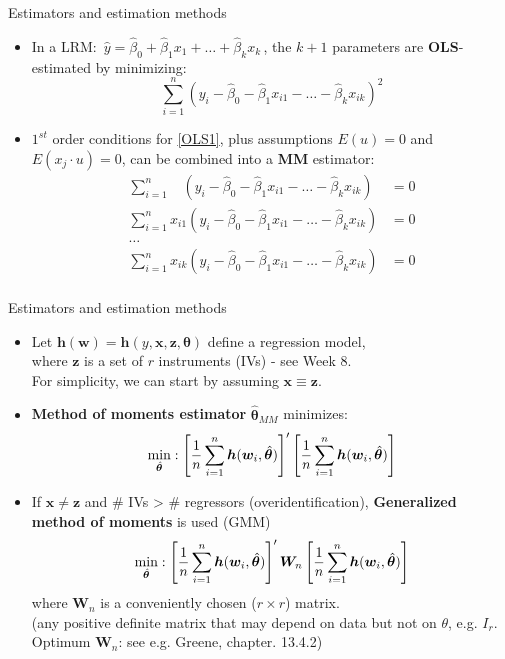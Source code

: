 \documentclass{beamer}
\begin{document}
\begin{frame}{Estimators and estimation methods}
\begin{itemize}
\item In a LRM: $\, \hat{y} = \hat{\beta}_0 + \hat{\beta}_1 x_{1} + \dots + \hat{\beta}_k x_{k} \,$, the $k+1$ parameters are \textbf{OLS}-estimated by minimizing:
\begin{equation} \label{OLS1}
\sum_{i=1}^n \left( y_i - \hat{\beta}_0 - \hat{\beta}_1 x_{i1} - \dots - \hat{\beta}_k x_{ik} \right)^2
\end{equation}
\item $1^{st}$ order conditions for \eqref{OLS1}, plus assumptions $E(u)=0$ and $E(x_j \cdot u)=0$, can be combined into a \textbf{MM} estimator:
\begin{equation*}
\begin{aligned}
\sum_{i=1}^n ~~~~\left( y_i - \hat{\beta}_0 - \hat{\beta}_1 x_{i1} - \dots - \hat{\beta}_k x_{ik} \right) &= 0\\
\sum_{i=1}^n  x_{i1} \left( y_i - \hat{\beta}_0 - \hat{\beta}_1 x_{i1} - \dots - \hat{\beta}_k x_{ik} \right) &= 0\\
\dots &\\
\sum_{i=1}^n x_{ik} \left( y_i - \hat{\beta}_0 - \hat{\beta}_1 x_{i1} - \dots - \hat{\beta}_k x_{ik} \right) &= 0\\
\end{aligned}
\end{equation*}
\end{itemize}
\end{frame}
\begin{frame}{Estimators and estimation methods}
\begin{itemize}
    \item Let $\bm{h}(\bm{w}) = \bm{h}(y,\bm{x}, \bm{z}, \bm{\theta})$ define a regression model, 
    \\where $\bm{z}$ is a set of $r$ instruments (IVs) - see Week 8.
    \\For simplicity, we can start by assuming  $\bm{x} \equiv \bm{z}$.
    \item \textbf{Method of moments estimator} $\hat{\bm{\theta}}_{\textit{MM}}$ minimizes:
    $$
    \underset{\hat{\bm{\theta}}}{\textnormal{min}}:
    \left[ \frac{1}{n} \sum_{i=1}^n \bm{h}(\bm{w}_i,\hat{\bm{\theta}} )
    \right]^{\prime}
    \left[ \frac{1}{n} \sum_{i=1}^n \bm{h}(\bm{w}_i,\hat{\bm{\theta}} )
    \right]
    $$
    \item If $\bm{x} \neq \bm{z}$ and \# IVs > \# regressors (overidentification), \textbf{Generalized method of moments} is used (GMM)
    $$
    \underset{\hat{\bm{\theta}}}{\textnormal{min}}:
    \left[ \frac{1}{n} \sum_{i=1}^n \bm{h}(\bm{w}_i,\hat{\bm{\theta}} )
    \right]^{\prime} \bm{W}_n
    \left[ \frac{1}{n} \sum_{i=1}^n \bm{h}(\bm{w}_i,\hat{\bm{\theta}} )
    \right]
    $$
    where $\bm{W}_n$ is a conveniently chosen ($r \times r$) matrix. 
    \\ \small{(any positive definite matrix that may depend on data but not on $\theta$, e.g. $I_r$. Optimum $\bm{W}_n$: see e.g. Greene, chapter. 13.4.2)}
\end{itemize}
\end{frame}
\end{document}
